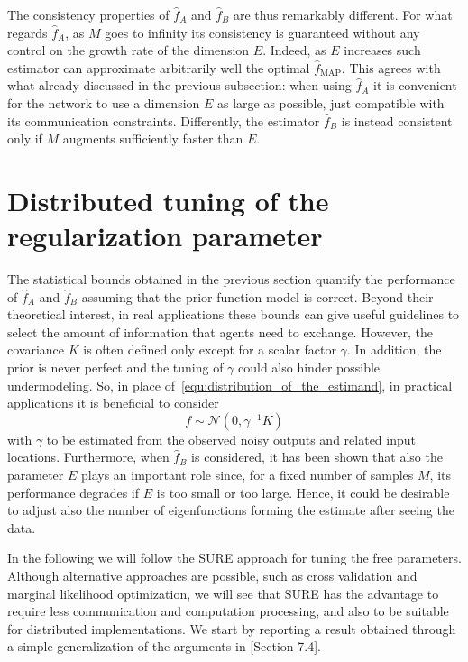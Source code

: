 \documentclass[10pt,twocolumn,twoside]{IEEEtran}					%
\theoremstyle	{plain}
\newcommand{\GaussianDistribution}					[2]	{\mathcal{N} \left( #1, #2 \right)}
\def\MAP{\textrm{MAP}}
\begin{document}
The consistency properties of $\widehat{f}_{A}$ and $\widehat{f}_{B}$ are thus remarkably different. For what regards $\widehat{f}_{A}$, as $M$ goes to infinity its consistency is guaranteed without any control on the growth rate of the dimension $E$. Indeed, as $E$ increases such estimator can approximate arbitrarily well the optimal $\widehat{f}_{\MAP}$. This agrees with what already discussed in the previous subsection: when using $\widehat{f}_{A}$ it is convenient for the network to use a dimension $E$ as large as possible, just compatible with its communication constraints. Differently, the estimator $\widehat{f}_{B}$ is instead consistent only if $M$ augments sufficiently faster than $E$. 

\section{Distributed tuning of the regularization parameter}
\label{sec:distributed_tuning_of_the_hyperparameters_of_widehat_f_a} 

The statistical bounds obtained in the previous section quantify the performance of $\widehat{f}_{A}$ and $\widehat{f}_{B}$ assuming that the prior function model is correct. Beyond their theoretical interest, in real applications these bounds can give useful guidelines to select the amount of information that agents need to exchange. However, the covariance $K$ is often defined only except for a scalar factor $\gamma$. In addition, the prior is never perfect and the tuning of $\gamma$ could also hinder possible undermodeling. So, in place of~\eqref{equ:distribution_of_the_estimand}, in practical applications it is beneficial to consider
\begin{equation}
	f \sim \GaussianDistribution{0}{\gamma^{-1} K}
	\label{equ:distribution_of_the_estimand2}
\end{equation}
with $\gamma$ to be estimated from the observed noisy outputs and related input locations. Furthermore, when $\widehat{f}_{B}$ is considered, it has been shown that also the parameter $E$ plays an important role since, for a fixed number of samples $M$, its performance degrades if $E$ is too small or too large. Hence, it could be desirable to adjust also the number of eigenfunctions forming the estimate after seeing the data.

In the following we will follow the \ac{SURE} approach for tuning the free parameters. Although alternative approaches are possible, such as cross validation and marginal likelihood optimization, we will see that \ac{SURE} has the advantage to require less communication and computation processing, and also to be suitable for distributed implementations. We start by reporting a result obtained through a simple generalization of the arguments in \cite{Hastie09}[Section 7.4].
 
\end{document}
